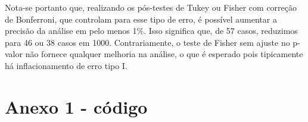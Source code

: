 \documentclass[
]{article}
\newenvironment{Shaded}{\begin{snugshade}}{\end{snugshade}}
\newcommand{\CommentTok}[1]{\textcolor[rgb]{0.56,0.35,0.01}{\textit{#1}}}
\newcommand{\DecValTok}[1]{\textcolor[rgb]{0.00,0.00,0.81}{#1}}
\newcommand{\FunctionTok}[1]{\textcolor[rgb]{0.00,0.00,0.00}{#1}}
\newcommand{\NormalTok}[1]{#1}
\newcommand{\OtherTok}[1]{\textcolor[rgb]{0.56,0.35,0.01}{#1}}
\newcommand{\SpecialCharTok}[1]{\textcolor[rgb]{0.00,0.00,0.00}{#1}}
\newcommand{\StringTok}[1]{\textcolor[rgb]{0.31,0.60,0.02}{#1}}
\begin{document}
Nota-se portanto que, realizando os pós-testes de Tukey ou Fisher com
correção de Bonferroni, que controlam para esse tipo de erro, é possível
aumentar a precisão da análise em pelo menos 1\%. Isso significa que, de
57 casos, reduzimos para 46 ou 38 casos em 1000. Contrariamente, o teste
de Fisher sem ajuste no p-valor não fornece qualquer melhoria na
análise, o que é esperado pois tipicamente há inflacionamento de erro
tipo I.

\hypertarget{anexo-1---cuxf3digo}{%
\section{Anexo 1 - código}\label{anexo-1---cuxf3digo}}

\begin{Shaded}
\end{Shaded}
\end{document}
